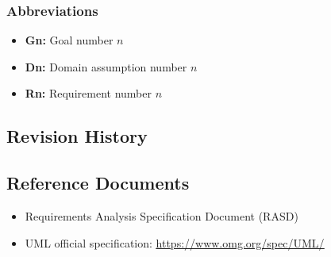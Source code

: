 \subsubsection{Abbreviations}
\begin{itemize}
    \item \textbf{Gn:} Goal number $n$
    \item \textbf{Dn:} Domain assumption number $n$
    \item \textbf{Rn:} Requirement number $n$
\end{itemize}
\subsection{Revision History}
\subsection{Reference Documents}
\begin{itemize}
    \item Requirements Analysis Specification Document (RASD)
    \item UML official specification: \underline{\url{https://www.omg.org/spec/UML/}}
\end{itemize}
